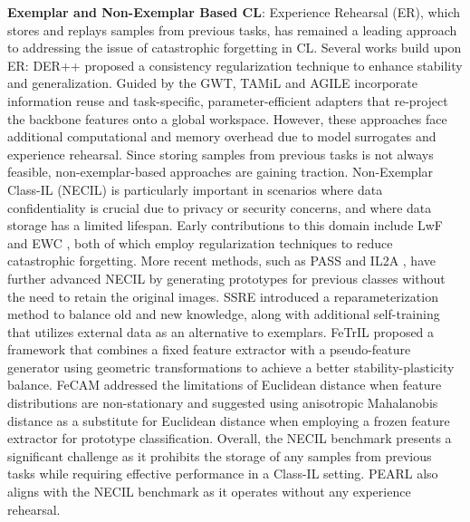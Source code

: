 \documentclass[10pt]{article} %
\begin{document}
\textbf{Exemplar and Non-Exemplar Based CL}: Experience Rehearsal (ER), which stores and replays samples from previous tasks, has remained a leading approach to addressing the issue of catastrophic forgetting in CL. Several works build upon ER: DER++ \citep{buzzega2020dark} proposed a consistency regularization technique to enhance stability and generalization. Guided by the GWT, TAMiL \citep{bhat2022task} and AGILE \citep{bhat2024mitigating} incorporate information reuse and task-specific, parameter-efficient adapters that re-project the backbone features onto a global workspace. However, these approaches face additional computational and memory overhead due to model surrogates and experience rehearsal. Since storing samples from previous tasks is not always feasible, non-exemplar-based approaches are gaining traction. Non-Exemplar Class-IL (NECIL) is particularly important in scenarios where data confidentiality is crucial due to privacy or security concerns, and where data storage has a limited lifespan. Early contributions to this domain include LwF \citep{li2017learning} and EWC \citep{kirkpatrick2017overcoming}, both of which employ regularization techniques to reduce catastrophic forgetting. More recent methods, such as PASS \citep{zhu2021prototype} and IL2A \citep{zhu2021class}, have further advanced NECIL by generating prototypes for previous classes without the need to retain the original images. SSRE \citep{zhu2022self} introduced a reparameterization method to balance old and new knowledge, along with additional self-training that utilizes external data as an alternative to exemplars. FeTrIL \citep{petit2023fetril} proposed a framework that combines a fixed feature extractor with a pseudo-feature generator using geometric transformations to achieve a better stability-plasticity balance. FeCAM \citep{goswami2024fecam} addressed the limitations of Euclidean distance when feature distributions are non-stationary and suggested using anisotropic Mahalanobis distance as a substitute for Euclidean distance when employing a frozen feature extractor for prototype classification. Overall, the NECIL benchmark presents a significant challenge as it prohibits the storage of any samples from previous tasks while requiring effective performance in a Class-IL setting. PEARL also aligns with the NECIL benchmark as it operates without any experience rehearsal.


\end{document}
